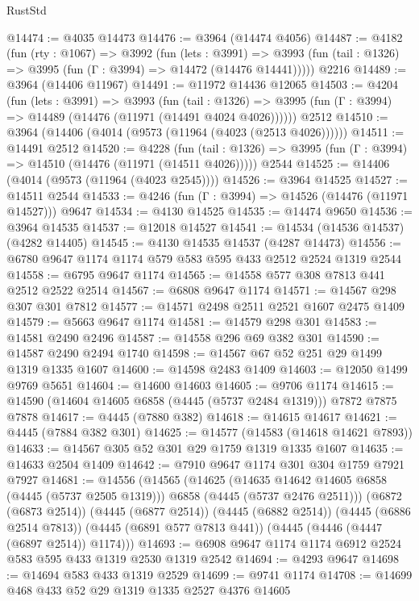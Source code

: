 \begin{lexlean}{RustStd}
\begin{coremodule}
@14474 := @4035 @14473
@14476 := @3964 (@14474 @4056)
@14487 := @4182
    (fun (rty : @1067) =>
    @3992
      (fun (lets : @3991) =>
      @3993 (fun (tail : @1326) => @3995 (fun (Γ : @3994) => @14472 (@14476 @14441)))))
    @2216
@14489 := @3964 (@14406 @11967)
@14491 := @11972 @14436 @12065
@14503 := @4204
    (fun (lets : @3991) =>
    @3993
      (fun (tail : @1326) =>
      @3995 (fun (Γ : @3994) => @14489 (@14476 (@11971 (@14491 @4024 @4026))))))
    @2512
@14510 := @3964 (@14406 (@4014 (@9573 (@11964 (@4023 (@2513 @4026))))))
@14511 := @14491 @2512
@14520 := @4228
    (fun (tail : @1326) => @3995 (fun (Γ : @3994) => @14510 (@14476 (@11971 (@14511 @4026)))))
    @2544
@14525 := @14406 (@4014 (@9573 (@11964 (@4023 @2545))))
@14526 := @3964 @14525
@14527 := @14511 @2544
@14533 := @4246 (fun (Γ : @3994) => @14526 (@14476 (@11971 @14527))) @9647
@14534 := @4130 @14525
@14535 := @14474 @9650
@14536 := @3964 @14535
@14537 := @12018 @14527
@14541 := @14534 (@14536 @14537) (@4282 @14405)
@14545 := @4130 @14535 @14537 (@4287 @14473)
@14556 := @6780 @9647 @1174 @1174 @579 @583 @595 @433 @2512 @2524 @1319 @2544
@14558 := @6795 @9647 @1174
@14565 := @14558 @577 @308 @7813 @441 @2512 @2522 @2514
@14567 := @6808 @9647 @1174
@14571 := @14567 @298 @307 @301 @7812
@14577 := @14571 @2498 @2511 @2521 @1607 @2475 @1409
@14579 := @5663 @9647 @1174
@14581 := @14579 @298 @301
@14583 := @14581 @2490 @2496
@14587 := @14558 @296 @69 @382 @301
@14590 := @14587 @2490 @2494 @1740
@14598 := @14567 @67 @52 @251 @29 @1499 @1319 @1335 @1607
@14600 := @14598 @2483 @1409
@14603 := @12050 @1499 @9769 @5651
@14604 := @14600 @14603
@14605 := @9706 @1174
@14615 := @14590 (@14604 @14605 @6858 (@4445 (@5737 @2484 @1319))) @7872 @7875 @7878
@14617 := @4445 (@7880 @382)
@14618 := @14615 @14617
@14621 := @4445 (@7884 @382 @301)
@14625 := @14577 (@14583 (@14618 @14621 @7893))
@14633 := @14567 @305 @52 @301 @29 @1759 @1319 @1335 @1607
@14635 := @14633 @2504 @1409
@14642 := @7910 @9647 @1174 @301 @304 @1759 @7921 @7927
@14681 := @14556
    (@14565
      (@14625
        (@14635 @14642 @14605 @6858 (@4445 (@5737 @2505 @1319)))
        @6858
        (@4445 (@5737 @2476 @2511)))
      (@6872 (@6873 @2514))
      (@4445 (@6877 @2514))
      (@4445 (@6882 @2514))
      (@4445 (@6886 @2514 @7813))
      (@4445 (@6891 @577 @7813 @441))
      (@4445 (@4446 (@4447 (@6897 @2514)) @1174)))
@14693 := @6908 @9647 @1174 @1174 @6912 @2524 @583 @595 @433 @1319 @2530 @1319 @2542
@14694 := @4293 @9647
@14698 := @14694 @583 @433 @1319 @2529
@14699 := @9741 @1174
@14708 := @14699 @468 @433 @52 @29 @1319 @1335 @2527 @4376 @14605

\end{coremodule}
\end{lexlean}
